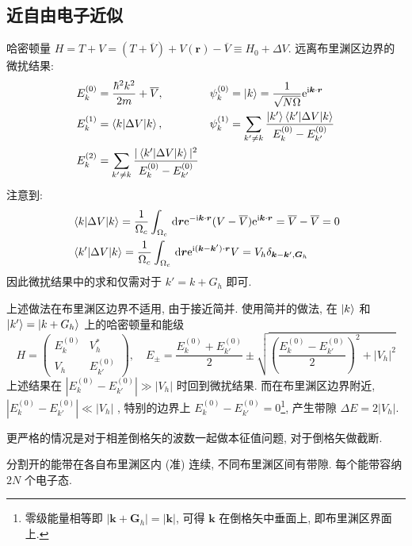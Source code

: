 \documentclass[11pt,a4paper]{article}%
\numberwithin{equation}{section}%
\renewcommand*{\vec}[1]{\bm{#1}}%
\newcommand{\dif}{\,\mathrm d}
\newcommand\mi{\mathrm{i}}
\newcommand\e{\mathrm{e}}%
\begin{document}
\subsection{近自由电子近似} %
\label{sub:nearly_free_e}
哈密顿量 $H = T + V = (T+\overline V) + V(\vec r)-\overline V \equiv H_0 + \Delta V$. 远离布里渊区边界的微扰结果: 
\begin{align}
	&E_k^{(0)} = \frac{\hbar^2 k^2}{2m} + \overline V, &&\psi_k^{(0)} = \ket{k} = \frac 1{\sqrt{N\Omega}}\e^{\mi \vec k\cdot\vec r}  \\
	&E_k^{(1)} = \braket{k|\Delta V|k}, &&\psi_k^{(1)} = \sum_{k'\neq k}\frac{\ket{k'}\braket{k'|\Delta V|k}}{E_k^{(0)} - E_{k'}^{(0)}}\\
	&E_k^{(2)} = \sum_{k'\neq k}\frac{|\braket{k'|\Delta V|k}|^2}{E_k^{(0)}-E_{k'}^{(0)}}
\end{align}
注意到: 
\begin{align}
	&\braket{k|\Delta V|k} = \frac 1{\Omega_c}\int_{\Omega_c}\dif\vec r\e^{-\mi\vec k\cdot\vec r}(V-\overline V)\e^{\mi\vec k\cdot\vec r} = \overline V - \overline V = 0 \\
	&\braket{k'|\Delta V|k} = \frac 1{\Omega_c}\int_{\Omega_c}\dif\vec r\e^{\mi(\vec k - \vec k')\cdot\vec r} V = V_h\delta_{\vec k-\vec k', \vec G_h}
\end{align}
因此微扰结果中的求和仅需对于 $k' = k + G_h$ 即可. 

上述做法在布里渊区边界不适用, 由于接近简并. 使用简并的做法, 在 $\ket{k}$ 和 $\ket{k'} = \ket{k+G_h}$ 上的哈密顿量和能级
\begin{equation}
	H = \begin{pmatrix}
		E_k^{(0)} & V_h^* \\
		V_h       & E_{k'}^{(0)}
	\end{pmatrix}, \quad
	E_\pm = \frac{E_k^{(0)}+E_{k'}^{(0)}}2 \pm \sqrt{\left( \frac{E_k^{(0)}-E_{k'}^{(0)}}2\right)^2 + |V_h|^2}
\end{equation}
上述结果在 $ \left|E_k^{(0)}-E_{k'}^{(0)}\right| \gg |V_h|$ 时回到微扰结果. 而在布里渊区边界附近, $\left|E_k^{(0)}-E_{k'}^{(0)}\right| \ll |V_h|$ , 特别的边界上 $E_k^{(0)}-E_{k'}^{(0)} = 0$\footnote{零级能量相等即 $|\vec k + \vec G_h| = |\vec k|$, 可得 $\vec k$ 在倒格矢中垂面上, 即布里渊区界面上.}, 产生带隙 $\Delta E = 2|V_h|$. 

更严格的情况是对于相差倒格矢的波数一起做本征值问题, 对于倒格矢做截断. 

分割开的能带在各自布里渊区内 (准) 连续, 不同布里渊区间有带隙. 每个能带容纳 $2N$ 个电子态.
\end{document}

